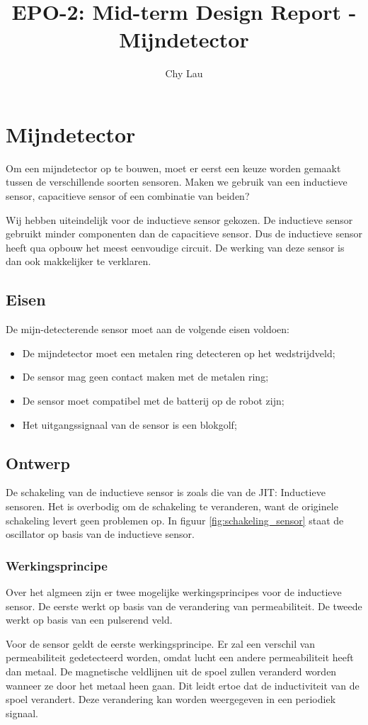 \documentclass{report}
\title{EPO-2: Mid-term Design Report - Mijndetector}
\author{Chy Lau}
\begin{document}
\chapter{Mijndetector}
\label{ch:mijn}
Om een mijndetector op te bouwen, moet er eerst een keuze worden gemaakt tussen de verschillende soorten sensoren. Maken we gebruik van een inductieve sensor, capacitieve sensor of een combinatie van beiden?

Wij hebben uiteindelijk voor de inductieve sensor gekozen. De inductieve sensor gebruikt minder componenten dan de capacitieve sensor. Dus de inductieve sensor heeft qua opbouw het meest eenvoudige circuit. De werking van deze sensor is dan ook makkelijker te verklaren. 

\section{Eisen}
\label{sec:eisen}
De mijn-detecterende sensor moet aan de volgende eisen voldoen: 
\begin{itemize}
\item De mijndetector moet een metalen ring detecteren op het wedstrijdveld;
\item De sensor mag geen contact maken met de metalen ring;
\item De sensor moet compatibel met de batterij op de robot zijn; 
\item Het uitgangssignaal van de sensor is een blokgolf;
\end{itemize}

\section{Ontwerp}
\label{sec:ontwerp}
De schakeling van de inductieve sensor is zoals die van de JIT: Inductieve sensoren. Het is overbodig om de schakeling te veranderen, want de originele schakeling levert geen problemen op. In figuur \ref{fig:schakeling_sensor} staat de oscillator op basis van de inductieve sensor.

\subsection{Werkingsprincipe}
\label{ssec:werking}
Over het algmeen zijn er twee mogelijke werkingsprincipes voor de inductieve sensor. De eerste werkt op basis van de verandering van permeabiliteit. De tweede werkt op basis van een pulserend veld. 

Voor de sensor geldt de eerste werkingsprincipe. Er zal een verschil van permeabiliteit gedetecteerd worden, omdat lucht een andere permeabiliteit heeft dan metaal. De magnetische veldlijnen uit de spoel zullen veranderd worden wanneer ze door het metaal heen gaan. Dit leidt ertoe dat de inductiviteit van de spoel verandert. Deze verandering kan worden weergegeven in een periodiek signaal.
\end{document}
